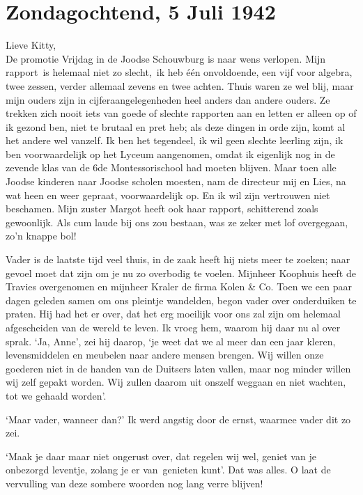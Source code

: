 \documentclass{book}
\begin{document}
\section*{Zondagochtend, 5 Juli 1942}

Lieve Kitty,\\
De promotie Vrijdag in de Joodse Schouwburg is naar wens
verlopen. Mijn rapport~is helemaal niet zo slecht,~ik heb één onvoldoende, een
vijf voor algebra, twee zessen, verder allemaal zevens en twee achten. Thuis
waren ze wel blij, maar mijn ouders zijn in cijferaangelegenheden heel anders
dan andere ouders. Ze trekken zich nooit iets van goede of slechte rapporten aan
en letten er alleen op of ik gezond ben, niet te brutaal en pret heb; als deze
dingen in orde zijn, komt al het andere wel vanzelf. Ik ben het tegendeel, ik
wil geen slechte leerling zijn, ik ben voorwaardelijk op het Lyceum aangenomen,
omdat ik eigenlijk nog in de zevende klas van de 6de Montessorischool had moeten
blijven. Maar toen alle Joodse kinderen naar Joodse scholen moesten, nam de
directeur mij en Lies, na wat heen en weer gepraat, voorwaardelijk op. En ik wil
zijn vertrouwen niet beschamen. Mijn zuster Margot heeft ook haar rapport,
schitterend zoals gewoonlijk. Als cum laude bij ons zou bestaan, was ze zeker
met lof overgegaan, zo'n knappe bol!

Vader is de laatste tijd veel thuis, in de zaak heeft hij niets meer te zoeken;
naar gevoel moet dat zijn om je nu zo overbodig te voelen.  Mijnheer Koophuis
heeft de Travies overgenomen en mijnheer Kraler de firma Kolen \& Co. Toen we
een paar dagen geleden samen om ons pleintje wandelden, begon vader over
onderduiken te praten. Hij had het er over, dat het erg moeilijk voor ons zal
zijn om helemaal afgescheiden van de wereld te leven. Ik vroeg hem, waarom hij
daar nu al over sprak. `Ja, Anne', zei hij daarop, `je weet dat we al meer dan
een jaar kleren, levensmiddelen en meubelen naar andere mensen brengen. Wij
willen onze goederen niet in de handen van de Duitsers laten vallen, maar nog
minder willen wij zelf gepakt worden. Wij zullen daarom uit onszelf weggaan en
niet wachten, tot we gehaald worden'.

`Maar vader, wanneer dan?' Ik werd angstig door de ernst, waarmee vader dit zo
zei.

`Maak je daar maar niet ongerust over, dat regelen wij wel, geniet van je
onbezorgd leventje, zolang je er van~genieten kunt'. Dat was alles. O laat de
vervulling van deze sombere woorden nog lang verre blijven!
\end{document}
